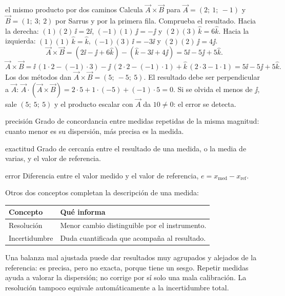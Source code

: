 \documentclass[11pt,a4paper]{article}
\begin{document}
\begin{examplebox}{el mismo producto por dos caminos}
 Calcula $\vec A\times\vec B$ para $\vec A=(2;\ 1;\ -1)$ y
$\vec B=(1;\ 3;\ 2)$ por Sarrus y por la primera fila. Comprueba el resultado.
\solutionblock
{} Hacia la derecha: $(1)(2)\,\ii=2\ii$, $(-1)(1)\,\jj=-\jj$ y
$(2)(3)\,\hat k=6\hat k$. Hacia la izquierda: $(1)(1)\,\hat k=\hat k$,
$(-1)(3)\,\ii=-3\ii$ y $(2)(2)\,\jj=4\jj$.
\[
\vec A\times\vec B=(2\ii-\jj+6\hat k)-(\hat k-3\ii+4\jj)=5\ii-5\jj+5\hat k.
\]
\[
\vec A\times\vec B=\ii\,(1\cdot2-(-1)\cdot3)-\jj\,(2\cdot2-(-1)\cdot1)
+\hat k\,(2\cdot3-1\cdot1)=5\ii-5\jj+5\hat k.
\]
Los dos m\'etodos dan $\vec A\times\vec B=(5;\ -5;\ 5)$.
 El resultado debe ser perpendicular a $\vec A$:
$\vec A\cdot(\vec A\times\vec B)=2\cdot5+1\cdot(-5)+(-1)\cdot5=0$.
Si se olvida el menos de $\jj$, sale $(5;\ 5;\ 5)$ y el producto escalar con $\vec A$
da $10\ne0$: el error se detecta.
\end{examplebox}

\begin{defbox}{precisi\'on}
Grado de concordancia entre medidas repetidas de la misma magnitud: cuanto menor es su
dispersi\'on, m\'as precisa es la medida.
\end{defbox}
\begin{defbox}{exactitud}
Grado de cercan\'ia entre el resultado de una medida, o la media de varias, y el valor
de referencia.
\end{defbox}
\begin{defbox}{error}
Diferencia entre el valor medido y el valor de referencia,
$e=x_{\mathrm{med}}-x_{\mathrm{ref}}$.
\end{defbox}
Otros dos conceptos completan la descripci\'on de una medida:

\begin{tabularx}{\linewidth}{@{}p{2.8cm}Y@{}}
\toprule
Concepto & Qu\'e informa\\
\midrule
Resoluci\'on & Menor cambio distinguible por el instrumento.\\
Incertidumbre & Duda cuantificada que acompa\~na al resultado.\\
\bottomrule
\end{tabularx}
Una balanza mal ajustada puede dar resultados muy agrupados y alejados de la
referencia: es precisa, pero no exacta, porque tiene un sesgo. Repetir medidas ayuda a
valorar la dispersi\'on; no corrige por s\'i solo una mala calibraci\'on.
La resoluci\'on tampoco equivale autom\'aticamente a la incertidumbre total.
\end{document}
